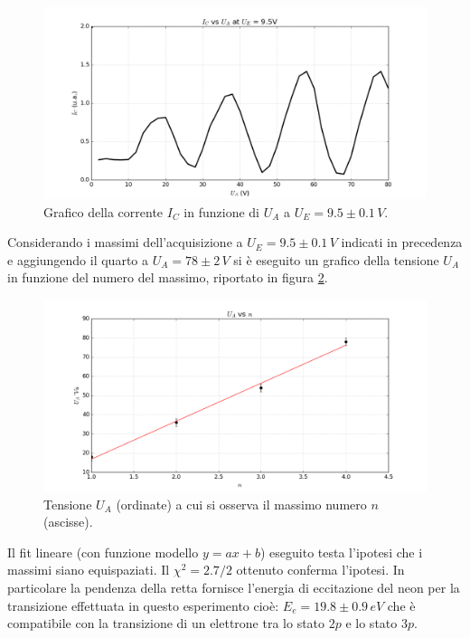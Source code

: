 \documentclass[10pt,a4paper]{article}
\begin{document}
\begin{figure}[!htb]
  \centering
  \includegraphics[scale=.5]{plot95.png}
\caption{Grafico della corrente $I_C$ in funzione di $U_A$ a $U_E = 9.5 \pm 0.1\, V$.\label{fig:grafico6}}

\end{figure}

Considerando i massimi dell'acquisizione a $U_E = 9.5 \pm 0.1\,V$ indicati in precedenza e aggiungendo il quarto a $U_A=78\pm2\,V$ si è eseguito un grafico della tensione $U_A$ in funzione del numero del massimo, riportato in figura \ref{ordine}.\\ 


\begin{figure}[!htb]
  \centering
  \includegraphics[scale=.5]{ordine.png}
\caption{Tensione $U_A$ (ordinate) a cui si osserva il massimo numero $n$ (ascisse).\label{ordine}}

\end{figure}

Il fit lineare (con funzione modello $y = ax+b$) eseguito testa l'ipotesi che i massimi siano equispaziati. Il $\chi^2 = 2.7/2$ ottenuto conferma l'ipotesi. In particolare la pendenza della retta fornisce l'energia di eccitazione del neon per la transizione effettuata in questo esperimento cioè: $E_e = 19.8 \pm 0.9 \, eV$ che è compatibile con  la transizione di un elettrone tra lo stato $2p$ e lo stato $3p$.
\end{document}
